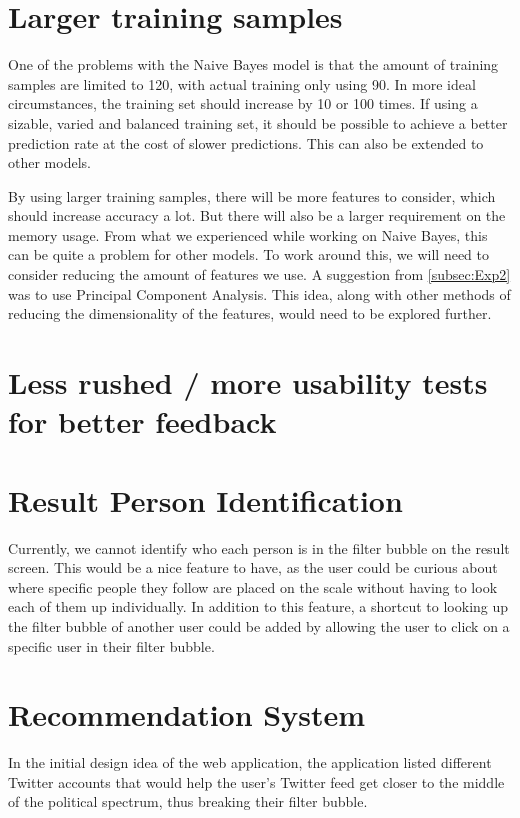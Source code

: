 \section*{Larger training samples}
One of the problems with the Naive Bayes model is that the amount of training
samples are limited to 120, with actual training only using 90. In more ideal
circumstances, the training set should increase by 10 or 100 times. If using a
sizable, varied and balanced training set, it should be possible to achieve a
better prediction rate at the cost of slower predictions. This can also be
extended to other models.\nl

By using larger training samples, there will be more features to consider, which
should increase accuracy a lot. But there will also be a larger requirement on
the memory usage. From what we experienced while working on Naive
Bayes, this can be quite a problem for other models. To work around
this, we will need to consider reducing the amount of features we use. A
suggestion from \autoref{subsec:Exp2} was to use Principal Component Analysis.
This idea, along with other methods of reducing the dimensionality of the
features, would need to be explored further.

\section*{Less rushed / more usability tests for better feedback}

\section*{Result Person Identification}
Currently, we cannot identify who each person is in the filter bubble on the
result screen. This would be a nice feature to have, as the user could be
curious about where specific people they follow are placed on the scale without
having to look each of them up individually. In addition to this feature, a
shortcut to looking up the filter bubble of another user could be added by
allowing the user to click on a specific user in their filter bubble.



\section{Recommendation System}
In the initial design idea of the web application, the application listed
different Twitter accounts that would help the user's Twitter feed get closer to
the middle of the political spectrum, thus breaking their filter bubble. \nl

